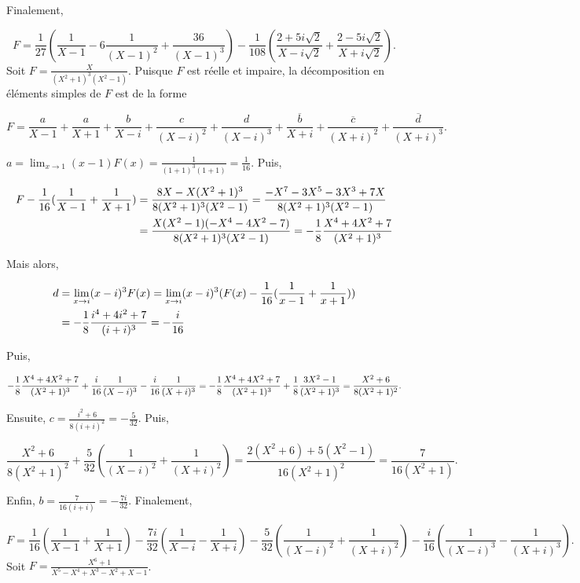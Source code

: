 {{Finalement,

$$F=\frac{1}{27}(\frac{1}{X-1}-6\frac{1}{(X-1)^2}+\frac{36}{(X-1)^3})-\frac{1}{108}(\frac{2+5i\sqrt{2}}{X-i\sqrt{2}}+\frac{2-5i\sqrt{2}}{X+i\sqrt{2}}).$$
Soit $F=\frac{X}{(X^2+1)^3(X^2-1)}$. Puisque $F$ est réelle et impaire, la décomposition en éléments simples de $F$ est de la forme

$$F=\frac{a}{X-1}+\frac{a}{X+1}+\frac{b}{X-i}+\frac{c}{(X-i)^2}+\frac{d}{(X-i)^3}+\frac{\overline{b}}{X+i}+\frac{\overline{c}}{(X+i)^2}+\frac{\overline{d}}{(X+i)^3}.$$

$a=\lim_{x\rightarrow 1}(x-1)F(x)=\frac{1}{(1+1)^3(1+1)}=\frac{1}{16}$. Puis,

\begin{align*}\ensuremath
F-\frac{1}{16}(\frac{1}{X-1}+\frac{1}{X+1})&=\frac{8X-X(X^2+1)^3}{8(X^2+1)^3(X^2-1)}
=\frac{-X^7-3X^5-3X^3+7X}{8(X^2+1)^3(X^2-1)}\\
 &=\frac{X(X^2-1)(-X^4-4X^2-7)}{8(X^2+1)^3(X^2-1)}=-\frac{1}{8}\frac{X^4+4X^2+7}{(X^2+1)^3}
\end{align*}

Mais alors, 

\begin{align*}\ensuremath
d&=\lim_{x\rightarrow i}(x-i)^3F(x)=\lim_{x\rightarrow i}(x-i)^3(F(x)-\frac{1}{16}(\frac{1}{x-1}+\frac{1}{x+1}))\\
 &=-\frac{1}{8}\frac{i^4+4i^2+7}{(i+i)^3}=-\frac{i}{16}
\end{align*}

Puis,

\begin{align*}\ensuremath
-\frac{1}{8}\frac{X^4+4X^2+7}{(X^2+1)^3}+\frac{i}{16}\frac{1}{(X-i)^3}-\frac{i}{16}\frac{1}{(X+i)^3}=
-\frac{1}{8}\frac{X^4+4X^2+7}{(X^2+1)^3}+\frac{1}{8}\frac{3X^2-1}{(X^2+1)^3}=\frac{X^2+6}{8(X^2+1)^2}.
\end{align*}

Ensuite, $c=\frac{i^2+6}{8(i+i)^2}=-\frac{5}{32}$. Puis,

$$\frac{X^2+6}{8(X^2+1)^2}+\frac{5}{32}(\frac{1}{(X-i)^2}+\frac{1}{(X+i)^2})
=\frac{2(X^2+6)+5(X^2-1)}{16(X^2+1)^2}=\frac{7}{16(X^2+1)}.$$

Enfin, $b=\frac{7}{16(i+i)}=-\frac{7i}{32}$. Finalement,

$$F=\frac{1}{16}(\frac{1}{X-1}+\frac{1}{X+1})-\frac{7i}{32}(\frac{1}{X-i}-\frac{1}{X+i})-\frac{5}{32}(\frac{1}{(X-i)^2}+\frac{1}{(X+i)^2})-\frac{i}{16}(\frac{1}{(X-i)^3}-\frac{1}{(X+i)^3}).$$
Soit $F=\frac{X^6+1}{X^5-X^4+X^3-X^2+X-1}$.

}}

